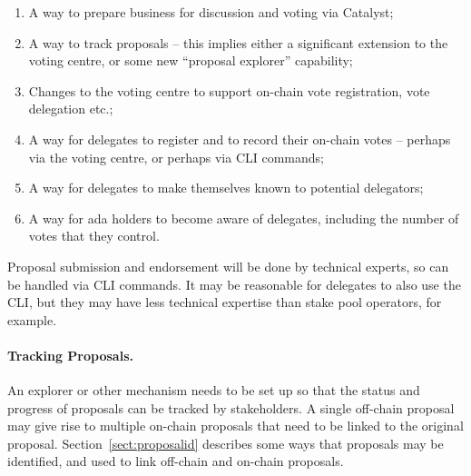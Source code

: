 \begin{enumerate}
\item
  A way to prepare business for discussion and voting via Catalyst;
\item
  A way to track proposals -- this implies either a significant extension to the voting centre, or some new ``proposal explorer'' capability;
\item
  Changes to the voting centre to support on-chain vote registration, vote delegation etc.;
\item
  A way for delegates to register and to record their on-chain votes -- perhaps via the voting centre, or perhaps via CLI commands;
\item
  A way for delegates to make themselves known to potential delegators;
\item
  A way for ada holders to become aware of delegates, including the number of votes that they control.
\end{enumerate}


Proposal submission and endorsement will be done by technical experts, so can be handled via CLI commands.  It may be reasonable for delegates
to also use the CLI, but they may have less technical expertise than stake pool operators, for example.

\paragraph{Tracking Proposals.}

An explorer or other mechanism needs to be set up so that the status and progress of proposals can be tracked by stakeholders.  A single off-chain proposal may give rise
to multiple on-chain proposals that need to be linked to the original proposal.  Section~\ref{sect:proposalid} describes some ways that proposals may be identified, and used
to link off-chain and on-chain proposals.
